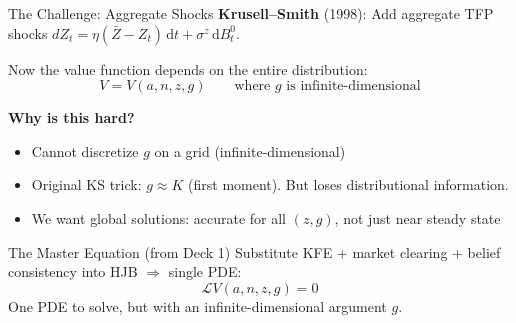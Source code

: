 \documentclass[aspectratio=169,11pt]{beamer}
\newcommand{\emphc}[1]{\textcolor{harvardcrimson}{#1}}
\newcommand{\ud}{\,\mathrm{d}}
\begin{document}
\begin{frame}{The Challenge: Aggregate Shocks}
\small
\textbf{Krusell--Smith} (1998): Add aggregate TFP shocks $dZ_t = \eta(\bar{Z}-Z_t)\ud t + \sigma^z\ud B_t^0$.

\vspace{0.2em}
Now the value function depends on the \emphc{entire distribution}:
\[
V = V(a, n, z, g) \qquad \text{where } g \text{ is infinite-dimensional}
\]

\vspace{0.1em}
\textbf{Why is this hard?}
\begin{itemize}\itemsep2pt
    \item Cannot discretize $g$ on a grid (infinite-dimensional)
    \item Original KS trick: $g \approx K$ (first moment). But loses distributional information.
    \item We want \emphc{global} solutions: accurate for all $(z, g)$, not just near steady state
\end{itemize}

\vspace{0.2em}
\begin{block}{The Master Equation (from Deck 1)}
\small
Substitute KFE + market clearing + belief consistency into HJB $\Rightarrow$ \emphc{single PDE}:
\[
\mathcal{L}V(a, n, z, g) = 0
\]
One PDE to solve, but with an infinite-dimensional argument $g$.
\end{block}
\end{frame}
\end{document}

